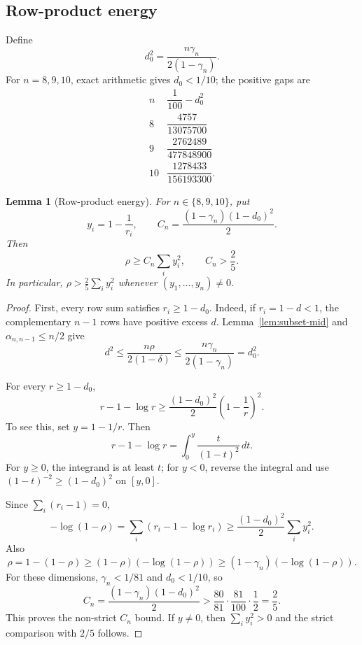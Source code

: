 \documentclass[11pt,a4paper]{article}
\numberwithin{equation}{section}
\newtheorem{lemma}[theorem]{Lemma}
\theoremstyle{definition}
\newcommand{\1}{\mathbf{1}}
\begin{document}
\subsection{Row-product energy}

Define
\begin{equation}\label{eq:d0}
 d_0^2=\frac{n\gamma_n}{2(1-\gamma_n)}.
\end{equation}
For $n=8,9,10$, exact arithmetic gives $d_0<1/10$; the positive gaps are
\begin{equation}\label{eq:d0-gaps}
\begin{array}{c|c}
 n&\dfrac1{100}-d_0^2\\ \hline
 8&\dfrac{4757}{13075700}\\[2mm]
 9&\dfrac{2762489}{477848900}\\[2mm]
 10&\dfrac{1278433}{156193300}.
\end{array}
\end{equation}

\begin{lemma}[Row-product energy]\label{lem:row-energy}
For $n\in\{8,9,10\}$, put
\[
 y_i=1-\frac1{r_i},
 \qquad
 C_n=\frac{(1-\gamma_n)(1-d_0)^2}{2}.
\]
Then
\begin{equation}\label{eq:row-energy}
 \rho\ge C_n\sum_i y_i^2,
 \qquad C_n>\frac25.
\end{equation}
In particular, $\rho>\frac25\sum_i y_i^2$ whenever
$(y_1,\dots,y_n)\ne0$.
\end{lemma}

\begin{proof}
First, every row sum satisfies $r_i\ge1-d_0$.  Indeed, if $r_i=1-d<1$, the complementary $n-1$ rows have positive excess $d$.  Lemma~\ref{lem:subset-mid} and $\alpha_{n,n-1}\le n/2$ give
\[
 d^2\le\frac{n\rho}{2(1-\delta)}
 \le\frac{n\gamma_n}{2(1-\gamma_n)}=d_0^2.
\]

For every $r\ge1-d_0$,
\begin{equation}\label{eq:log-energy}
 r-1-\log r
 \ge\frac{(1-d_0)^2}{2}
 \left(1-\frac1r\right)^2.
\end{equation}
To see this, set $y=1-1/r$.  Then
\[
 r-1-\log r=\int_0^y\frac{t}{(1-t)^2}\,dt.
\]
For $y\ge0$, the integrand is at least $t$; for $y<0$, reverse the integral and use $(1-t)^{-2}\ge(1-d_0)^2$ on $[y,0]$.

Since $\sum_i(r_i-1)=0$,
\[
 -\log(1-\rho)
 =\sum_i(r_i-1-\log r_i)
 \ge\frac{(1-d_0)^2}{2}\sum_i y_i^2.
\]
Also
\[
 \rho=1-(1-\rho)
 \ge(1-\rho)(-\log(1-\rho))
 \ge(1-\gamma_n)(-\log(1-\rho)).
\]
For these dimensions, $\gamma_n<1/81$ and $d_0<1/10$, so
\[
 C_n=\frac{(1-\gamma_n)(1-d_0)^2}{2}
 >\frac{80}{81}\cdot\frac{81}{100}\cdot\frac12
 =\frac25.
\]
This proves the non-strict $C_n$ bound.  If $y\ne0$, then
$\sum_i y_i^2>0$ and the strict comparison with $2/5$ follows.
\end{proof}
\end{document}
